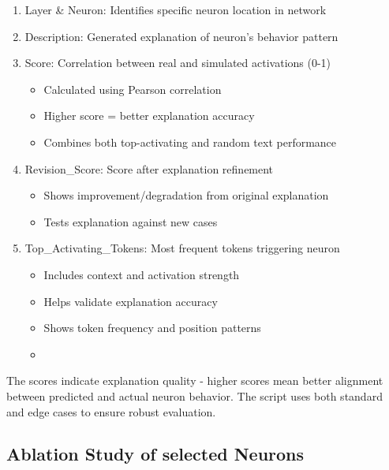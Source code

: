 \begin{enumerate}
            \item Layer \& Neuron: Identifies specific neuron location in network
            \item Description: Generated explanation of neuron's behavior pattern
            \item Score: Correlation between real and simulated activations (0-1)
            \begin{itemize}
                \item Calculated using Pearson correlation
                \item Higher score = better explanation accuracy
                \item Combines both top-activating and random text performance
            \end{itemize}
            \item Revision\_Score: Score after explanation refinement
            \begin{itemize}
                \item Shows improvement/degradation from original explanation
                \item Tests explanation against new cases
            \end{itemize}
            \item Top\_Activating\_Tokens: Most frequent tokens triggering neuron
            \begin{itemize}
                \item Includes context and activation strength
                \item Helps validate explanation accuracy
                \item Shows token frequency and position patterns
        \item 
    \end{itemize}
\end{enumerate}
The scores indicate explanation quality - higher scores mean better alignment between predicted and actual neuron behavior. The script uses both standard and edge cases to ensure robust evaluation.

\subsection{Ablation Study of selected Neurons}


